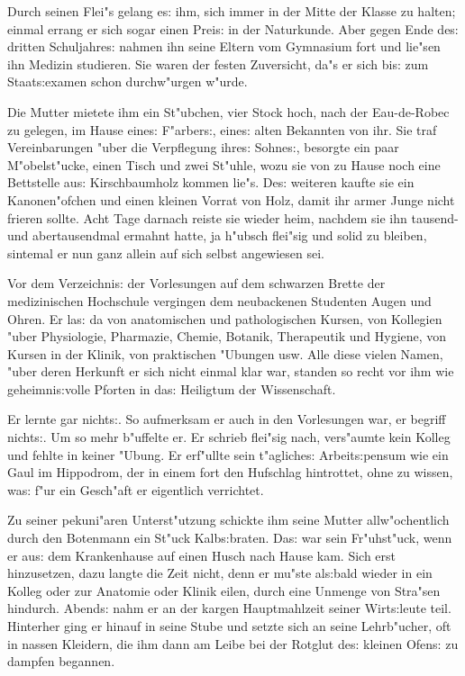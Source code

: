 \documentclass[oneside,12pt]{book}
\newcommand{\s}{s:}%
\begin{document}
Durch seinen Flei"s gelang e{\s} ihm, sich immer in der Mitte der
Klasse zu halten; einmal errang er sich sogar einen Prei{\s} in
der Naturkunde. Aber gegen Ende de{\s} dritten Schuljahre{\s}
nahmen ihn seine Eltern vom Gymnasium fort und lie"sen ihn Medizin
studieren. Sie waren der festen Zuversicht, da"s er sich bi{\s}
zum Staat{\s}examen schon durchw"urgen w"urde.

Die Mutter mietete ihm ein St"ubchen, vier Stock hoch, nach der
Eau-de-Robec zu gelegen, im Hause eine{\s} F"arber{\s}, eine{\s}
alten Bekannten von ihr. Sie traf Vereinbarungen "uber die
Verpflegung ihre{\s} Sohne{\s}, besorgte ein paar M"obelst"ucke,
einen Tisch und zwei St"uhle, wozu sie von zu Hause noch eine
Bettstelle au{\s} Kirschbaumholz kommen lie"s. De{\s} weiteren
kaufte sie ein Kanonen"ofchen und einen kleinen Vorrat von Holz,
damit ihr armer Junge nicht frieren sollte. Acht Tage darnach
reiste sie wieder heim, nachdem sie ihn tausend- und
abertausendmal ermahnt hatte, ja h"ubsch flei"sig und solid zu
bleiben, sintemal er nun ganz allein auf sich selbst angewiesen sei.

Vor dem Verzeichni{\s} der Vorlesungen auf dem schwarzen Brette
der medizinischen Hochschule vergingen dem neubackenen Studenten
Augen und Ohren. Er la{\s} da von anatomischen und pathologischen
Kursen, von Kollegien "uber Physiologie, Pharmazie, Chemie,
Botanik, Therapeutik und Hygiene, von Kursen in der Klinik, von
praktischen "Ubungen usw. Alle diese vielen Namen, "uber deren
Herkunft er sich nicht einmal klar war, standen so recht vor ihm
wie geheimni{\s}volle Pforten in da{\s} Heiligtum der
Wissenschaft.

Er lernte gar nicht{\s}. So aufmerksam er auch in den Vorlesungen
war, er begriff nicht{\s}. Um so mehr b"uffelte er. Er schrieb
flei"sig nach, vers"aumte kein Kolleg und fehlte in keiner "Ubung.
Er erf"ullte sein t"agliche{\s} Arbeit{\s}pensum wie ein Gaul im
Hippodrom, der in einem fort den Hufschlag hintrottet, ohne zu
wissen, wa{\s} f"ur ein Gesch"aft er eigentlich verrichtet.

Zu seiner pekuni"aren Unterst"utzung schickte ihm seine Mutter
all\-w"ochentlich durch den Botenmann ein St"uck Kalb{\s}braten.
Da{\s} war sein Fr"uh\-st"uck, wenn er au{\s} dem Krankenhause auf
einen Husch nach Hause kam. Sich erst hinzusetzen, dazu langte die
Zeit nicht, denn er mu"ste al{\s}bald wieder in ein Kolleg oder
zur Anatomie oder Klinik eilen, durch eine Unmenge von Stra"sen
hindurch. Abend{\s} nahm er an der kargen Hauptmahlzeit seiner
Wirt{\s}leute teil. Hinterher ging er hinauf in seine Stube und
setzte sich an seine Lehrb"ucher, oft in nassen Kleidern, die ihm
dann am Leibe bei der Rotglut de{\s} kleinen Ofen{\s} zu dampfen
begannen.
\end{document}
